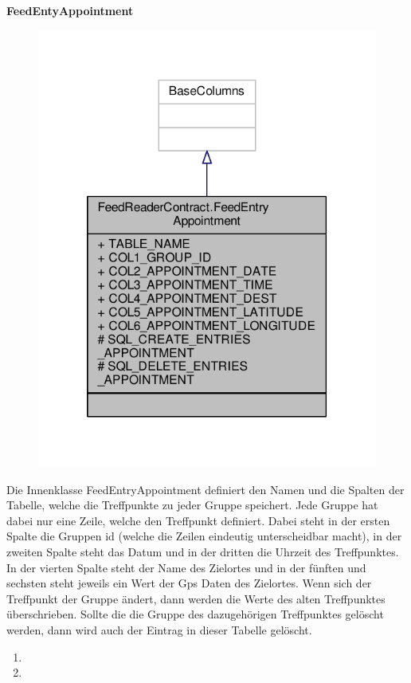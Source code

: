 \textbf{FeedEntyAppointment}
\begin{figure}[H]
	\includegraphics[scale = 1]{res/umlClasses/feed_reader_contract_appointment.pdf}
	\centering
\end{figure}
Die Innenklasse FeedEntryAppointment definiert den Namen und die Spalten der Tabelle, welche die Treffpunkte zu jeder Gruppe speichert. Jede Gruppe hat dabei nur eine Zeile, welche den Treffpunkt definiert. 
Dabei steht in der ersten Spalte die Gruppen id (welche die Zeilen eindeutig unterscheidbar macht), in der zweiten Spalte steht das Datum und in der dritten die Uhrzeit des Treffpunktes. In der vierten Spalte steht der Name des Zielortes und in der fünften und sechsten steht jeweils ein Wert der Gps Daten des Zielortes. 
Wenn sich der Treffpunkt der Gruppe ändert, dann werden die Werte des alten Treffpunktes überschrieben.
Sollte die die Gruppe des dazugehörigen Treffpunktes gelöscht werden, dann wird auch der Eintrag in dieser Tabelle gelöscht.
\begin{enumerate}
	\item
	\item
\end{enumerate}



